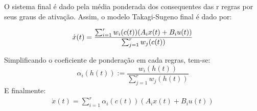 O sistema final é dado pela média ponderada dos consequentes das r regras por seus graus de ativação. Assim, o modelo Takagi-Sugeno final é dado por:

\begin{align*}
	 \dot{x}(t) = \frac{\sum_{i=1}^{r}  w_i(c(t))(A_i  x(t) +  B_i  u(t))}{\sum_{j=1}^{r} w_j(c(t))} \vspace{0.5cm}
\end{align*}

Simplificando o coeficiente de ponderação em cada regras, tem-se:
\begin{equation*}
	\alpha_i (h(t)) := \frac{w_i(h(t))}{\sum_{j=1}^{r}w_j(h(t))}
\end{equation*}
E finalmente:
\begin{align} \label{eqModTakSug}
	 \dot{x}(t) = \sum_{i=1}^{r} \alpha_i (c(t))(A_i  x(t) +  B_i  u(t))
\end{align}

%

